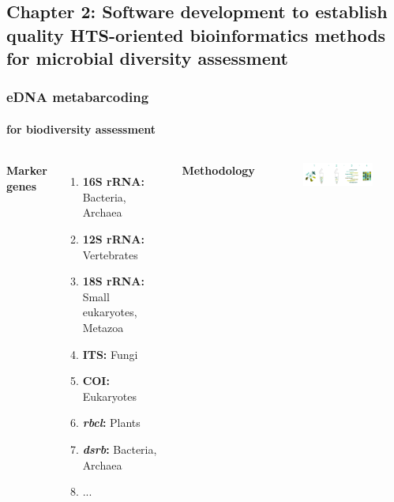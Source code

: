 \documentclass{beamer}
\begin{document}


   \begin{darkframes}
      \section{
         \textbf{Chapter 2}: Software development to establish quality HTS-oriented bioinformatics methods for microbial diversity assessment
      }
   \end{darkframes}

   \begin{frame}
      
      \frametitle{eDNA metabarcoding}
      \framesubtitle{for biodiversity assessment}
      \begin{singlespace}


         \begin{columns}[onlytextwidth]


               \textbf{Marker genes} \\ 

               \begin{enumerate}
                  \item \textbf{16S rRNA:} Bacteria, Archaea
                  \item \textbf{12S rRNA:} Vertebrates
                  \item \textbf{18S rRNA:} Small eukaryotes, Metazoa
                  \item \textbf{ITS:} Fungi
                  \item \textbf{COI:} Eukaryotes
                  \item \textbf{\textit{rbcl}:} Plants
                  \item \textbf{\textit{dsrb}:} Bacteria, Archaea
                  \item ...
               \end{enumerate}


               \textbf{Methodology}

               \begin{figure}
                  \includegraphics[width=55mm]{resources/metabarcoding-steps.png}
               \end{figure}


\end{columns}
\end{singlespace}
\end{frame}
\end{document}
